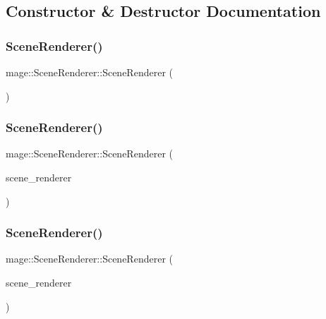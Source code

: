 \subsection{Constructor \& Destructor Documentation}
\hypertarget{classmage_1_1_scene_renderer_a5d91f3c9b4e6e7c16d77a6791fadbd64}{}\label{classmage_1_1_scene_renderer_a5d91f3c9b4e6e7c16d77a6791fadbd64} 
\subsubsection{\texorpdfstring{Scene\+Renderer()}{SceneRenderer()}\hspace{0.1cm}{\footnotesize\ttfamily [1/3]}}
{\footnotesize\ttfamily mage\+::\+Scene\+Renderer\+::\+Scene\+Renderer (\begin{DoxyParamCaption}{ }\end{DoxyParamCaption})}

\hypertarget{classmage_1_1_scene_renderer_a9ea97945a7675ef805f00fb437a3d1aa}{}\label{classmage_1_1_scene_renderer_a9ea97945a7675ef805f00fb437a3d1aa} 
\subsubsection{\texorpdfstring{Scene\+Renderer()}{SceneRenderer()}\hspace{0.1cm}{\footnotesize\ttfamily [2/3]}}
{\footnotesize\ttfamily mage\+::\+Scene\+Renderer\+::\+Scene\+Renderer (\begin{DoxyParamCaption}\item[{const \hyperlink{classmage_1_1_scene_renderer}{Scene\+Renderer} \&}]{scene\+\_\+renderer }\end{DoxyParamCaption})\hspace{0.3cm}{\ttfamily [delete]}}

\hypertarget{classmage_1_1_scene_renderer_ab9846f0a77e2bc5e9eeb00aed67424eb}{}\label{classmage_1_1_scene_renderer_ab9846f0a77e2bc5e9eeb00aed67424eb} 
\subsubsection{\texorpdfstring{Scene\+Renderer()}{SceneRenderer()}\hspace{0.1cm}{\footnotesize\ttfamily [3/3]}}
{\footnotesize\ttfamily mage\+::\+Scene\+Renderer\+::\+Scene\+Renderer (\begin{DoxyParamCaption}\item[{\hyperlink{classmage_1_1_scene_renderer}{Scene\+Renderer} \&\&}]{scene\+\_\+renderer }\end{DoxyParamCaption})\hspace{0.3cm}{\ttfamily [default]}}

